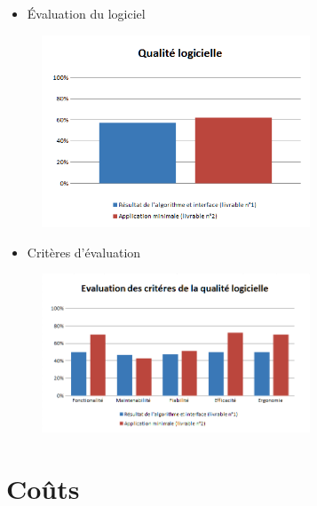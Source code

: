 \documentclass[xcolor=dvipsnames]{beamer}
\begin{document}
	\begin{frame}{\secname}
		\begin{itemize}
			\item \'Evaluation du logiciel 
		\end{itemize}
		\begin{figure}
			\includegraphics[width=8cm]{Images/QualiteLogicielle.png}
		\end{figure}
	\end{frame}


	\begin{frame}{\secname}
		\begin{itemize}
			\item Crit\`eres d'\'evaluation
		\end{itemize}
		\begin{figure}
			\includegraphics[width=8cm]{Images/EvaluationCriteres.png}
		\end{figure}
	\end{frame}




\section{Co\^uts}
\end{document}

